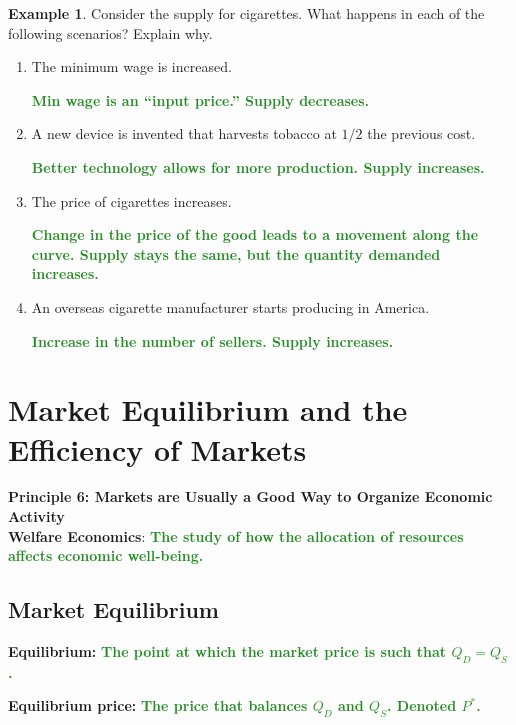 \documentclass[11pt]{article}\usepackage[]{graphicx}\usepackage[]{color}
\theoremstyle{definition}
\newtheorem{exmp}{Example}[section]
\newcommand{\ddp}[1]{{\textbf{\textcolor{ForestGreen}{#1}}}}
\newcommand{\defn}[1]{\textbf{#1}}
\begin{document}
\begin{exmp}
	Consider the supply for cigarettes.  What happens in each of the following scenarios? Explain why.
	
\begin{enumerate}
	\setlength{\itemsep}{1em}
		\item The minimum wage is increased.

	\ddp{Min wage is an ``input price.'' Supply decreases.}

	\item	A new device is invented that harvests tobacco at $1/2$ the previous cost.

	\ddp{Better technology allows for more production. Supply increases.}
 
	\item 	The price of cigarettes increases.

	\ddp{Change in the price of the good leads to a movement along the curve. Supply stays the same, but the quantity demanded increases.}
 
	\item	An overseas cigarette manufacturer starts producing in America.

	\ddp{Increase in the number of sellers. Supply increases.}
	
\end{enumerate}
	\end{exmp}
	
\newpage	
	
	\section{Market Equilibrium and the Efficiency of Markets}
	
	\textbf{Principle 6: Markets are Usually a Good Way to Organize Economic Activity}
	\\
	
	\defn{Welfare Economics}: \ddp{The study of how the allocation of resources affects economic well-being.}
		
		\subsection{Market Equilibrium}
		
		\defn{Equilibrium:} \ddp{The point at which the market price is such that $Q_D = Q_S$.\\}
		
		\defn{Equilibrium price:} \ddp{The price that balances $Q_D$ and $Q_S$. Denoted $P^*$.\\}
		
\end{document}

